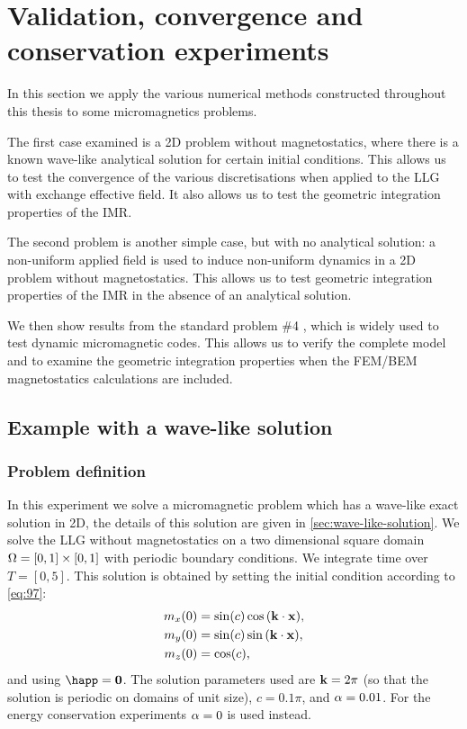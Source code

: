 \chapter{Validation, convergence and conservation experiments}
\label{cha:numer-experiments}

In this section we apply the various numerical methods constructed throughout this thesis to some micromagnetics problems.

The first case examined is a 2D problem without magnetostatics, where there is a known wave-like analytical solution for certain initial conditions.
This allows us to test the convergence of the various discretisations when applied to the LLG with exchange effective field.
It also allows us to test the geometric integration properties of the IMR.

The second problem is another simple case, but with no analytical solution: a non-uniform applied field is used to induce non-uniform dynamics in a 2D problem without magnetostatics.
This allows us to test geometric integration properties of the IMR in the absence of an analytical solution.

We then show results from the \mumag standard problem \#4 \cite{mumag-website}, which is widely used to test dynamic micromagnetic codes.
This allows us to verify the complete model and to examine the geometric integration properties when the FEM/BEM magnetostatics calculations are included.


\section{Example with a wave-like solution}
\label{sec:numer-exper}

\subsection{Problem definition}
\label{sec:wave-problem-definition}

In this experiment we solve a micromagnetic problem which has a wave-like exact solution in 2D, the details of this solution are given in \cref{sec:wave-like-solution}.
We solve the LLG without magnetostatics on a two dimensional square domain $\Omega = [0,1] \times [0,1]$ with periodic boundary conditions.
We integrate time over $T = [0, 5]$.
This solution is obtained by setting the initial condition according to \cref{eq:97}:
\begin{equation}
  \begin{aligned}
    m_x(0) &= \sin(c) \cos{\left( \boldsymbol{\mathrm{k}}\cdot \boldsymbol{\mathrm{x}}\right)}, \\
    m_y(0) &= \sin(c) \sin{\left( \boldsymbol{\mathrm{k}}\cdot \boldsymbol{\mathrm{x}}\right)}, \\
    m_z(0) &= \cos(c),
  \end{aligned}
\end{equation}
and using $\happ = \zerov$.
The solution parameters used are $\boldsymbol{\mathrm{k}} = 2\pi$ (so that the solution is periodic on domains of unit size), $c = 0.1\pi$, and $\alpha = 0.01$.
For the energy conservation experiments $\alpha = 0$ is used instead.


